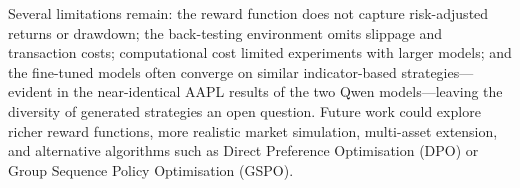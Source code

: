 \documentclass[conference,a4paper]{IEEEtran}
\begin{document}
Several limitations remain: the reward function does not capture risk-adjusted returns or
drawdown; the back-testing environment omits slippage and transaction costs;
computational cost limited experiments with larger models; and the fine-tuned models often
converge on similar indicator-based strategies---evident in the near-identical AAPL
results of the two Qwen models---leaving the diversity of generated strategies an open
question. Future work could explore
richer reward functions, more realistic market simulation, multi-asset extension, and
alternative algorithms such as Direct Preference Optimisation (DPO) or Group Sequence
Policy Optimisation (GSPO).



\end{document}

